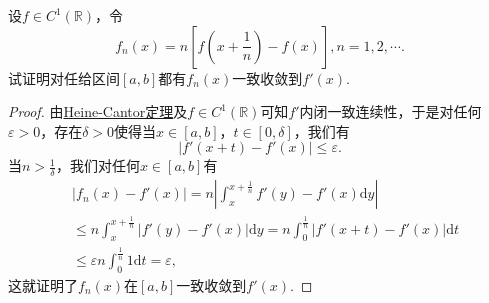 \documentclass[../../main.tex]{subfiles}%
\begin{document}
\begin{example}
设\(f \in C^1(\mathbb{R})\)，令
\[
f_n(x) = n \left[ f \left( x + \frac{1}{n} \right) - f(x) \right], n = 1, 2, \cdots.
\]
试证明对任给区间\([a, b]\)都有\(f_n(x)\)一致收敛到\(f'(x)\).
\end{example}
\begin{proof}
由\hyperref[theroem:Heine-Cantor定理]{Heine-Cantor定理}及\(f \in C^1(\mathbb{R})\)可知\(f'\)内闭一致连续性，于是对任何\(\varepsilon > 0\)，存在\(\delta > 0\)使得当\(x \in [a, b]\)，\(t \in [0, \delta]\)，我们有
\[
|f'(x + t) - f'(x)| \leqslant \varepsilon.
\]
当\(n > \frac{1}{\delta}\)，我们对任何\(x \in [a, b]\)有
\begin{align*}
&|f_n(x) - f'(x)| = n \left| \int_{x}^{x + \frac{1}{n}} f'(y) - f'(x) \mathrm{d}y \right| \\
&\leqslant n \int_{x}^{x + \frac{1}{n}} |f'(y) - f'(x)| \mathrm{d}y = n \int_{0}^{\frac{1}{n}} |f'(x + t) - f'(x)| \mathrm{d}t \\
&\leqslant \varepsilon n \int_{0}^{\frac{1}{n}} 1 \mathrm{d}t = \varepsilon,
\end{align*}
这就证明了\(f_n(x)\)在\([a, b]\)一致收敛到\(f'(x)\).
\end{proof}
\end{document}
